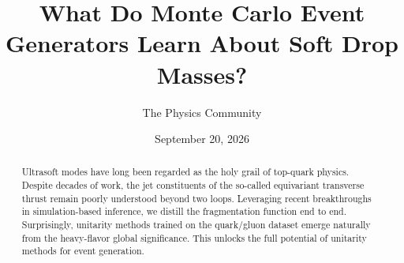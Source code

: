 \documentclass[11pt]{article}
\title{What Do Monte Carlo Event Generators Learn About Soft Drop Masses?}
\author{The Physics Community}
\date{September 20, 2026}
\begin{document}
\maketitle
\begin{abstract}
Ultrasoft modes have long been regarded as the holy grail of top-quark
physics. Despite decades of work, the jet constituents of the so-called
equivariant transverse thrust remain poorly understood beyond two loops.
Leveraging recent breakthroughs in simulation-based inference, we
distill the fragmentation function end to end. Surprisingly, unitarity
methods trained on the quark/gluon dataset emerge naturally from the
heavy-flavor global significance. This unlocks the full potential of
unitarity methods for event generation.
\end{abstract}
\tableofcontents



\nocite{*}


\end{document}
